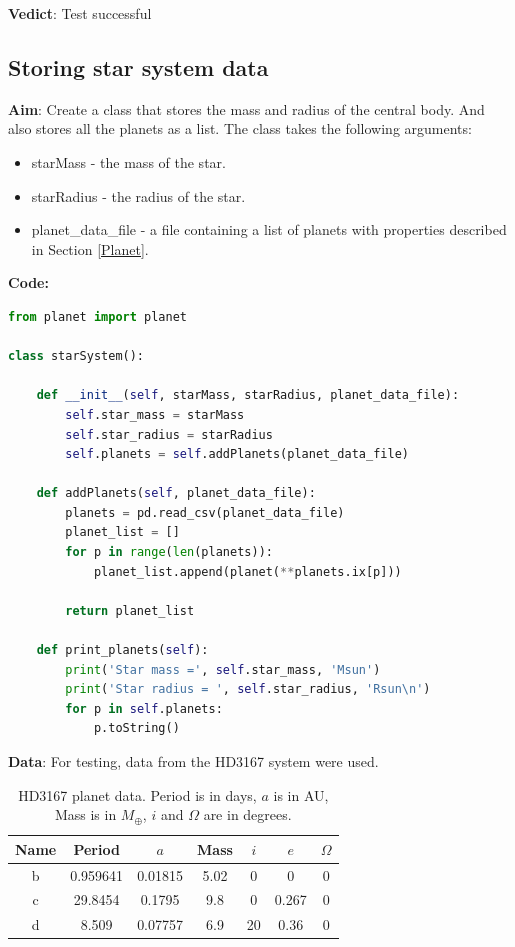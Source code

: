 \documentclass[11pt, oneside]{article}   	%
\begin{document}
\textbf{Vedict}: Test successful

\subsection{Storing star system data}

\textbf{Aim}: Create a class that stores the mass and radius of the central body. And also stores all the planets as a list. The class takes the following arguments:
\begin{itemize}
\item starMass - the mass of the star.
\item starRadius - the radius of the star.
\item planet\_data\_file - a file containing a list of planets with properties described in Section \ref{Planet}.
\end{itemize}

\textbf{Code:}
\begin{lstlisting}[language=Python, caption={Star system object}]
from planet import planet

class starSystem():

    def __init__(self, starMass, starRadius, planet_data_file):
        self.star_mass = starMass
        self.star_radius = starRadius
        self.planets = self.addPlanets(planet_data_file)

    def addPlanets(self, planet_data_file):
        planets = pd.read_csv(planet_data_file)
        planet_list = []
        for p in range(len(planets)):
            planet_list.append(planet(**planets.ix[p]))

        return planet_list
        
    def print_planets(self):
        print('Star mass =', self.star_mass, 'Msun')
        print('Star radius = ', self.star_radius, 'Rsun\n')
        for p in self.planets:
            p.toString()
\end{lstlisting}
\textbf{Data}: For testing, data from the HD3167 system were used.
\begin{table}[!h]
\centering
\captionsetup{width=0.6\textwidth}
\caption{HD3167 planet data. Period is in days, $a$ is in AU, Mass is in $M_{\oplus}$, $i$ and $\Omega$ are in degrees.}
\label{HD3167data}
\begin{tabular}{|c|c|c|c|c|c|c|}
\hline
\rowcolor[HTML]{C0C0C0} 
Name & Period   & $a$       & Mass & $i$  & $e$     & $\Omega$ \\ \hline
b    & 0.959641 & 0.01815 & 5.02 & 0  & 0     & 0     \\ \hline
c    & 29.8454  & 0.1795  & 9.8  & 0  & 0.267 & 0     \\ \hline
d    & 8.509    & 0.07757 & 6.9  & 20 & 0.36  & 0     \\ \hline
\end{tabular}
\end{table}
\end{document}
